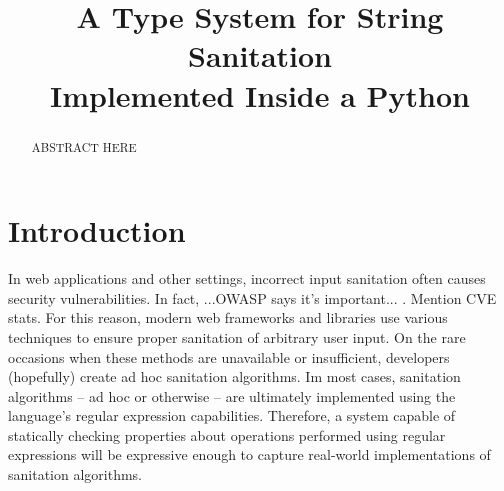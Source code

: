 \documentclass{acm_proc_article-sp}
\theoremstyle{definition}
\begin{document}


\newcommand{\Ace}{\textsf{Ace}}

\title{A Type System for String Sanitation\\Implemented Inside a Python}


\maketitle
\begin{abstract}
ABSTRACT HERE
\end{abstract}

\section{Introduction}\label{intro}
In web applications and other settings, incorrect input sanitation often causes
security vulnerabilities. In fact, ...OWASP says it's important... .
Mention CVE stats.
For this reason, modern web frameworks and libraries use various techniques to
ensure proper sanitation of arbitrary user input. On the rare occasions when
these methods are unavailable or insufficient, developers (hopefully) create 
ad hoc sanitation algorithms. Im most cases, sanitation algorithms -- ad hoc 
or otherwise -- are ultimately implemented using the language's regular
expression capabilities. Therefore, a system capable of statically 
checking properties about operations performed using regular expressions will
be expressive enough to capture real-world implementations of sanitation 
algorithms.
\end{document}
